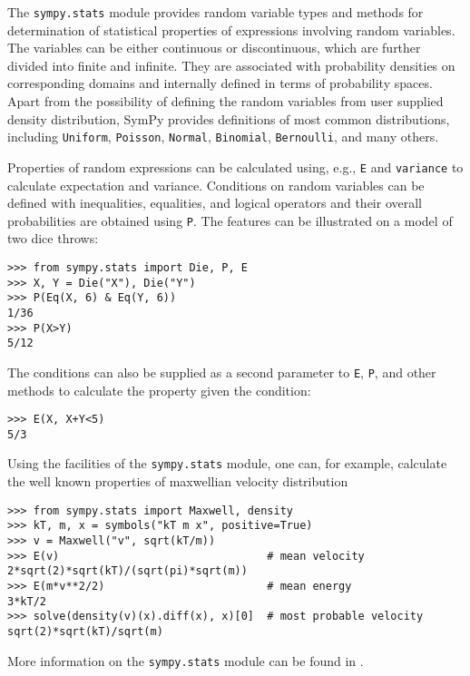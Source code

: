 The \verb|sympy.stats| module provides random variable types and methods for
determination of statistical properties of expressions involving random
variables. The variables can be either continuous or discontinuous, which are
further divided into finite and infinite. They are associated
with probability densities on corresponding domains and internally defined
in terms of probability spaces. 
Apart from the possibility of defining the random variables from user supplied
density distribution, SymPy provides definitions of most common
distributions, including \texttt{Uniform}, \texttt{Poisson}, \texttt{Normal},
\texttt{Binomial}, \texttt{Bernoulli}, and many others.

Properties of random expressions can be calculated using, e.g.,
\texttt{E} and \texttt{variance} to calculate expectation and variance.
Conditions on random variables can be defined with inequalities, equalities,
and logical operators and their overall probabilities are obtained using
\texttt{P}. The features can be illustrated on a model of two dice throws:
\begin{verbatim}
>>> from sympy.stats import Die, P, E
>>> X, Y = Die("X"), Die("Y")
>>> P(Eq(X, 6) & Eq(Y, 6))
1/36
>>> P(X>Y)
5/12
\end{verbatim}
The conditions can also be supplied as a second parameter to \texttt{E},
\texttt{P}, and other methods to calculate the property given the condition:
\begin{verbatim}
>>> E(X, X+Y<5)
5/3
\end{verbatim}

Using the facilities of the \texttt{sympy.stats} module, one can, for
example, calculate 
the well known properties of maxwellian velocity distribution
\begin{verbatim}
>>> from sympy.stats import Maxwell, density
>>> kT, m, x = symbols("kT m x", positive=True)
>>> v = Maxwell("v", sqrt(kT/m))
>>> E(v)                                # mean velocity
2*sqrt(2)*sqrt(kT)/(sqrt(pi)*sqrt(m))
>>> E(m*v**2/2)                         # mean energy
3*kT/2
>>> solve(density(v)(x).diff(x), x)[0]  # most probable velocity
sqrt(2)*sqrt(kT)/sqrt(m)
\end{verbatim}

More information on the \texttt{sympy.stats} module can be found in
\cite{StatsMRocklin}.
